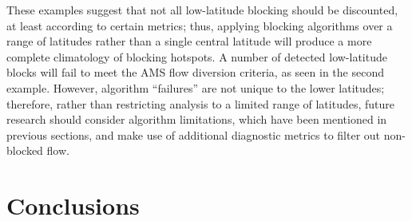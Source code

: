 \documentclass[smallextended]{svjour3}       %
\numberwithin{equation}{section}
\begin{document}
These examples suggest that not all low-latitude blocking should be discounted, at least according to certain metrics; thus, applying blocking algorithms over a range of latitudes rather than a single central latitude will produce a more complete climatology of blocking hotspots. A number of detected low-latitude blocks will fail to meet the AMS flow diversion criteria, as seen in the second example. However, algorithm ``failures'' are not unique to the lower latitudes; therefore, rather than restricting analysis to a limited range of latitudes, future research should consider algorithm limitations, which have been mentioned in previous sections, and make use of additional diagnostic metrics to filter out non-blocked flow.

\section{Conclusions}\label{concsec}
\end{document}
